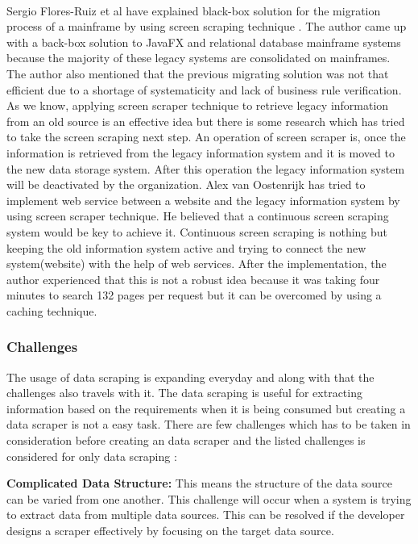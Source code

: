 \paragraph{}
Sergio Flores-Ruiz et al have explained black-box solution for the migration process of a mainframe by using screen scraping technique \cite{FlPeDoPu2018}. The author came up with a back-box solution to JavaFX and relational database mainframe systems because the majority of these legacy systems are consolidated on mainframes. The author also mentioned that the previous migrating solution was not that efficient due to a shortage of systematicity and lack of business rule verification. As we know, applying screen scraper technique to retrieve legacy information from an old source is an effective idea but there is some research which has tried to take the screen scraping next step. An operation of screen scraper is, once the information is retrieved from the legacy information system and it is moved to the new data storage system. After this operation the legacy information system will be deactivated by the organization. Alex van Oostenrijk \cite{Alex2004} has tried to implement web service between a website and the legacy information system by using screen scraper technique. He believed that a continuous screen scraping system would be key to achieve it. Continuous screen scraping is nothing but keeping the old information system active and trying to connect the new system(website) with the help of web services. After the implementation, the author experienced that this is not a robust idea because it was taking four minutes to search 132 pages per request but it can be overcomed by using a caching technique.

\subsubsection{Challenges}
%
%
The usage of data scraping is expanding everyday and along with that the challenges also travels with it. The data scraping is useful for extracting information based on the requirements when it is being consumed but creating a data scraper is not a easy task. There are few challenges which has to be taken in consideration before creating an data scraper and the listed challenges is considered for only data scraping \cite{And2021}\cite{Mic2020}:

{\bf Complicated Data Structure:} This means the structure of the data source can be varied from one another. This challenge will occur when a system is trying to extract data from multiple data sources. This can be resolved if the developer designs a scraper effectively by focusing on the target data source.

